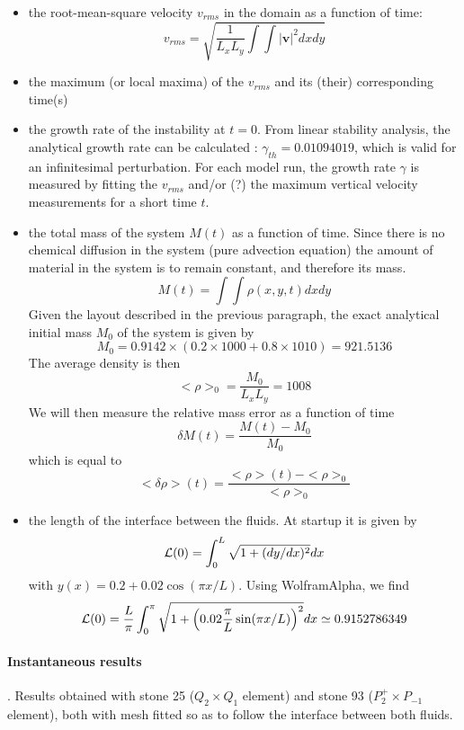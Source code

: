 \begin{itemize}

\item the root-mean-square velocity $v_{rms}$ in the domain as a function of time:
\begin{equation}
v_{rms}= \sqrt{ \frac{1}{L_xL_y} \int \int |{\bm v}|^2 dxdy}
\end{equation}

\item the maximum (or local maxima) of the $v_{rms}$ and its (their) corresponding time(s)

\item the growth rate of the instability at $t=0$.
From linear stability analysis, the analytical growth rate can be calculated \cite{ramb68,ramb81}: 
$\gamma_{th}=0.01094019$, which is valid for an infinitesimal perturbation. 
For each model run, the growth rate $\gamma$ is measured by fitting the $v_{rms}$ and/or (?) the maximum 
vertical velocity measurements for a short time $t$. 

\item the total mass of the system $M(t)$ as a function of time. Since there is no chemical diffusion in the 
system (pure advection equation) the amount of material in the system is to remain constant, and 
therefore its mass.
\begin{equation}
M(t) = \int \int \rho(x,y,t) dxdy
\end{equation}
Given the layout described in the previous paragraph, the exact analytical initial mass $M_0$ of the system 
is given by 
\[
M_0=0.9142 \times (0.2 \times 1000 + 0.8\times 1010) = 921.5136
\]
The average density is then 
\[
<\rho>_0=\frac{M_0}{L_xL_y} = 1008
\]
We will then measure the relative mass error as a function of time
\[
\delta M(t) = \frac{M(t)-M_0}{M_0}
\]
which is equal to 
\[
<\delta\rho>(t) = \frac{<\rho>(t)-<\rho>_0}{<\rho>_0}
\]

\item the length of the interface between the fluids. At startup it is given by 
\[
{\cal L}(0) = \int_0^L \sqrt{1 + (dy/dx)^2} dx
\]
with $y(x)=0.2+0.02\cos(\pi x/L)$. Using WolframAlpha, we find
\[
{\cal L}(0)= \frac{L}{\pi} \int_0^\pi \sqrt{1 + \left(0.02\frac{\pi}{L}\sin(\pi x /L) \right)^2} dx
\simeq 0.9152786349
\]

\end{itemize}




\paragraph{Instantaneous results}.
Results obtained with stone 25 ($Q_2\times Q_1$ element) 
and stone 93 ($P_2^+\times P_{-1}$ element), 
both with mesh fitted so as to follow the interface between both fluids.



